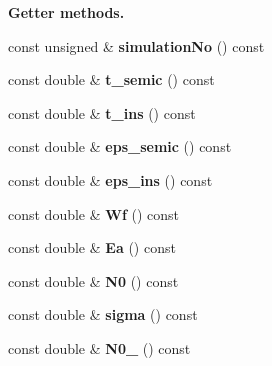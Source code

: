 \begin{Indent}{\bf Getter methods.}\par
\begin{DoxyCompactItemize}
\item 
\hypertarget{classParamsList_a012be3a46bf086c10c0b8906b1c0ece1}{const unsigned \& {\bfseries simulation\-No} () const }\label{classParamsList_a012be3a46bf086c10c0b8906b1c0ece1}

\item 
\hypertarget{classParamsList_aaa4ab91dd1fb090f0d91a4c703e8c55a}{const double \& {\bfseries t\-\_\-semic} () const }\label{classParamsList_aaa4ab91dd1fb090f0d91a4c703e8c55a}

\item 
\hypertarget{classParamsList_a186672cc6a2eec77e726ab8337791822}{const double \& {\bfseries t\-\_\-ins} () const }\label{classParamsList_a186672cc6a2eec77e726ab8337791822}

\item 
\hypertarget{classParamsList_a4375bbd2e7ad0cede170a5ceb3f14bd0}{const double \& {\bfseries eps\-\_\-semic} () const }\label{classParamsList_a4375bbd2e7ad0cede170a5ceb3f14bd0}

\item 
\hypertarget{classParamsList_a26c5e5f7e2f9768a5dfb927ab2f27b0c}{const double \& {\bfseries eps\-\_\-ins} () const }\label{classParamsList_a26c5e5f7e2f9768a5dfb927ab2f27b0c}

\item 
\hypertarget{classParamsList_adcd107e7354e9fc5b74af7315fa7df80}{const double \& {\bfseries Wf} () const }\label{classParamsList_adcd107e7354e9fc5b74af7315fa7df80}

\item 
\hypertarget{classParamsList_a7bb2ca3a9d5d0c39b2236a9bcb3e0815}{const double \& {\bfseries Ea} () const }\label{classParamsList_a7bb2ca3a9d5d0c39b2236a9bcb3e0815}

\item 
\hypertarget{classParamsList_a208a97deee7c9c07aa4a24563c116b43}{const double \& {\bfseries N0} () const }\label{classParamsList_a208a97deee7c9c07aa4a24563c116b43}

\item 
\hypertarget{classParamsList_aeab76c5d57194aecd33538540db7c42f}{const double \& {\bfseries sigma} () const }\label{classParamsList_aeab76c5d57194aecd33538540db7c42f}

\item 
\hypertarget{classParamsList_af17ca56cc73a7ebadb577308bd5b7ad6}{const double \& {\bfseries N0\-\_} () const }\label{classParamsList_af17ca56cc73a7ebadb577308bd5b7ad6}


\end{DoxyCompactItemize}
\end{Indent}
